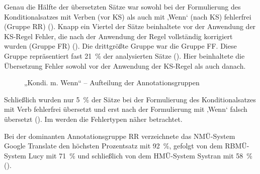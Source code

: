 Genau die Hälfte der übersetzten Sätze war sowohl bei der Formulierung des Konditionalsatzes mit Verben (vor KS) als auch mit ‚Wenn‘ (nach KS) fehlerfrei (Gruppe RR) (). Knapp ein Viertel der Sätze beinhaltete vor der Anwendung der KS-Regel Fehler, die nach der Anwendung der Regel vollständig korrigiert wurden (Gruppe FR) (). Die drittgrößte Gruppe war die Gruppe FF. Diese Gruppe repräsentiert fast 21~\% der analysierten Sätze (). Hier beinhaltete die Übersetzung Fehler sowohl vor der Anwendung der KS-Regel als auch danach.


\begin{figure}



\caption{\label{fig:05:49}   „Kondi. m. Wenn“ -- Aufteilung der Annotationsgruppen}

\end{figure}

Schließlich wurden nur 5~\% der Sätze bei der Formulierung des Konditionalsatzes mit Verb fehlerfrei übersetzt und erst nach der Formulierung mit ‚Wenn‘ falsch übersetzt (). Im  werden die Fehlertypen näher betrachtet.


Bei der dominanten Annotationsgruppe RR verzeichnete das NMÜ-System Google Translate den höchsten Prozentsatz mit 92~\%, gefolgt von dem RBMÜ-System Lucy mit 71~\% und schließlich von dem HMÜ-System Systran mit 58~\% ().


